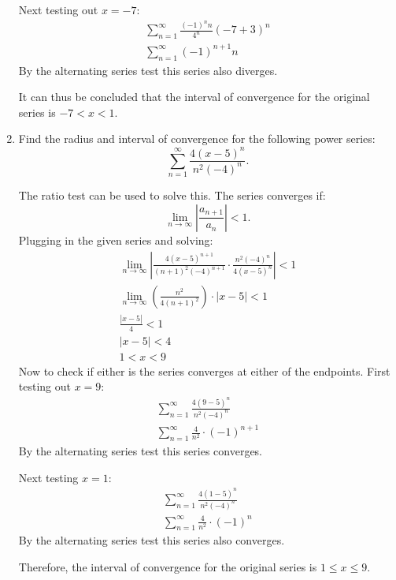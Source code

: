 \documentclass[12pt]{article}
\begin{document}
\begin{enumerate}
          Next testing out $x=-7$:
          \begin{align*}
              \sum_{n=1}^\infty \frac{(-1)^n n}{4^n} (-7+3)^n \\[6pt]
              \sum_{n=1}^\infty (-1)^{n+1} n
          \end{align*}
          By the alternating series test this series also diverges.

          It can thus be concluded that the interval of convergence for the original series is $-7 < x < 1$.
          \bigskip

    \item Find the radius and interval of convergence for the following power series:
          \[ \sum_{n=1}^\infty \frac{4(x-5)^n}{n^2 (-4)^n}. \]

          The ratio test can be used to solve this. The series converges if:
          \[ \lim_{n \to \infty} \left| \frac{a_{n+1}}{a_n} \right| < 1. \]
          Plugging in the given series and solving:
          \begin{gather*}
              \lim_{n \to \infty} \left| \frac{4(x-5)^{n+1}}{(n+1)^2 (-4)^{n+1}} \cdot \frac{n^2 (-4)^n}{4(x-5)^n} \right| < 1 \\[6pt]
              \lim_{n \to \infty} \left( \frac{n^2}{4(n+1)^2} \right) \cdot |x-5| < 1 \\[6pt]
              \frac{|x-5|}{4} < 1 \\[6pt]
              |x-5| < 4 \\
              1 < x < 9
          \end{gather*}
          Now to check if either is the series converges at either of the endpoints. First testing out $x=9$:
          \begin{gather*}
              \sum_{n=1}^\infty \frac{4(9-5)^n}{n^2 (-4)^n} \\[6pt]
              \sum_{n=1}^\infty \frac{4}{n^2} \cdot (-1)^{n+1}
          \end{gather*}
          By the alternating series test this series converges.

          Next testing $x=1$:
          \begin{gather*}
              \sum_{n=1}^\infty \frac{4(1-5)^n}{n^2 (-4)^n} \\[6pt]
              \sum_{n=1}^\infty \frac{4}{n^2} \cdot (-1)^{n}
          \end{gather*}
          By the alternating series test this series also converges.

          Therefore, the interval of convergence for the original series is $1 \le x \le 9$.
\end{enumerate}
\end{document}
